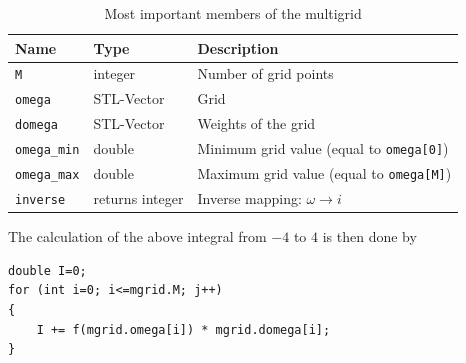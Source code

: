 \documentclass[a4paper]{scrreprt}
\begin{document}
\begin{table}[h]
	\begin{center}
		\begin{tabular}{l|l|l}\hline
		Name & Type & Description \\ \hline
		\texttt{M} & integer & Number of grid points\\\hline
		\texttt{omega} & STL-Vector & Grid\\\hline
		\texttt{domega} & STL-Vector & Weights of the grid\\\hline
		\texttt{omega\_min} & double & Minimum grid value (equal to \texttt{omega[0]}) \\\hline
		\texttt{omega\_max} & double & Maximum grid value (equal to \texttt{omega[M]}) \\\hline
		\texttt{inverse} & returns integer & Inverse mapping: $\omega\to i$ \\\hline
		\end{tabular}
	\end{center}
	\label{tab:member}
	\caption{Most important members of the multigrid}
\end{table}

The calculation of the above integral from $-4$ to $4$ is then done by

\begin{lstlisting}
double I=0;
for (int i=0; i<=mgrid.M; j++)
{
	I += f(mgrid.omega[i]) * mgrid.domega[i];
}
\end{lstlisting}

\end{document}

